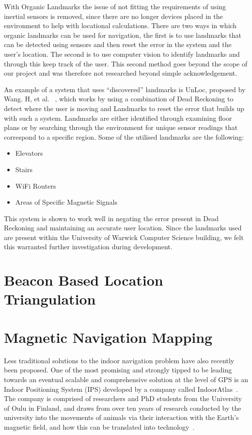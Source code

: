 \documentclass[12pt,a4paper]{report}
\begin{document}
With Organic Landmarks the issue of not fitting the requirements of using inertial sensors is removed, since there are no longer devices placed in the environment to help with locational calculations. There are two ways in which organic landmarks can be used for navigation, the first is to use landmarks that can be detected using sensors and then reset the error in the system and the user's location. The second is to use computer vision to identify landmarks and through this keep track of the user. This second method goes beyond the scope of our project and was therefore not researched beyond simple acknowledgement.

An example of a system that uses ``discovered'' landmarks is UnLoc, proposed by Wang. H, et al. ~\cite{wang2012no}, which works by using a combination of Dead Reckoning to detect where the user is moving and Landmarks to reset the error that builds up with such a system. Landmarks are either identified through examining floor plans or by searching through the environment for unique sensor readings that correspond to a specific region. Some of the utilised landmarks are the following:

\begin{itemize}
	\item Elevators
	\item Stairs
	\item WiFi Routers
	\item Areas of Specific Magnetic Signals
\end{itemize}

This system is shown to work well in negating the error present in Dead Reckoning and maintaining an accurate user location. Since the landmarks used are present within the University of Warwick Computer Science building, we felt this warranted further investigation during development.

\section{Beacon Based Location Triangulation}

\section{Magnetic Navigation Mapping}
 
Less traditional solutions to the indoor navigation problem have also recently been proposed. One of the most promising and strongly tipped to be leading towards an eventual scalable and comprehensive solution at the level of GPS is an Indoor Positioning System (IPS) developed by a company called IndoorAtlas~\cite{indoorAtlas}. The company is comprised of researchers and PhD students from the University of Oulu in Finland, and draws from over ten years of research conducted by the university into the movements of animals via their interaction with the Earth's magnetic field, and how this can be translated into technology~\cite{IAReport}.
 
\end{document}
